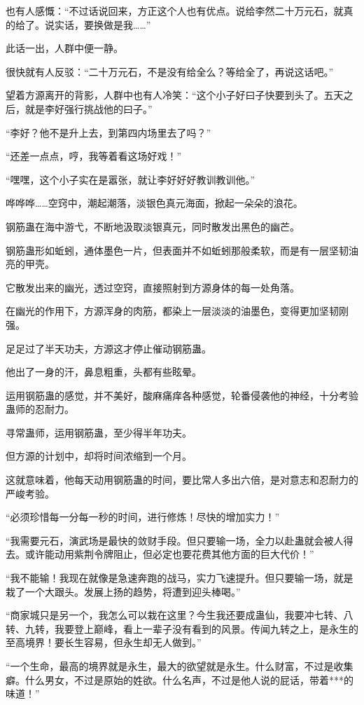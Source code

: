 \begin{this_body}
也有人感慨：“不过话说回来，方正这个人也有优点。说给李然二十万元石，就真的给了。说实话，要换做是我……”

此话一出，人群中便一静。

很快就有人反驳：“二十万元石，不是没有给全么？等给全了，再说这话吧。”

望着方源离开的背影，人群中也有人冷笑：“这个小子好曰子快要到头了。五天之后，就是李好强行挑战他的曰子。”

“李好？他不是升上去，到第四内场里去了吗？”

“还差一点点，哼，我等着看这场好戏！”

“嘿嘿，这个小子实在是嚣张，就让李好好好教训教训他。”

哗哗哗……空窍中，潮起潮落，淡银色真元海面，掀起一朵朵的浪花。

钢筋蛊在海中游弋，不断地汲取淡银真元，同时散发出黑色的幽芒。

钢筋蛊形如蚯蚓，通体墨色一片，但表面并不如蚯蚓那般柔软，而是有一层坚韧油亮的甲壳。

它散发出来的幽光，透过空窍，直接照射到方源身体的每一处角落。

在幽光的作用下，方源浑身的肉筋，都染上一层淡淡的油墨色，变得更加坚韧刚强。

足足过了半天功夫，方源这才停止催动钢筋蛊。

他出了一身的汗，鼻息粗重，头都有些眩晕。

运用钢筋蛊的感觉，并不美好，酸麻痛痒各种感觉，轮番侵袭他的神经，十分考验蛊师的忍耐力。

寻常蛊师，运用钢筋蛊，至少得半年功夫。

但方源的计划中，却将时间浓缩到一个月。

这就意味着，他每天动用钢筋蛊的时间，要比常人多出六倍，是对意志和忍耐力的严峻考验。

“必须珍惜每一分每一秒的时间，进行修炼！尽快的增加实力！”

“我需要元石，演武场是最快的敛财手段。但只要输一场，全力以赴蛊就会被人得去。或许能动用紫荆令牌阻止，但必定也要花费其他方面的巨大代价！”

“我不能输！我现在就像是急速奔跑的战马，实力飞速提升。但只要输一场，就是栽了一个大跟头。发展上扬的趋势，将遭到迎头棒喝。”

“商家城只是另一个，我怎么可以栽在这里？今生我还要成蛊仙，我要冲七转、八转、九转，我要登上巅峰，看上一辈子没有看到的风景。传闻九转之上，是永生的至高境界！要长生容易，但永生却无人做到。”

“一个生命，最高的境界就是永生，最大的欲望就是永生。什么财富，不过是收集癖。什么男女，不过是原始的姓欲。什么名声，不过是他人说的屁话，带着***的味道！”


\end{this_body}
